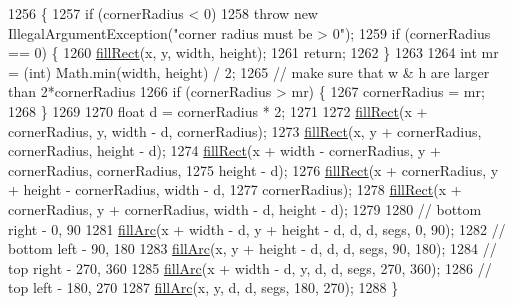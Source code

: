 \begin{DoxyCode}
1256                                         \{
1257         \textcolor{keywordflow}{if} (cornerRadius < 0)
1258             \textcolor{keywordflow}{throw} \textcolor{keyword}{new} IllegalArgumentException(\textcolor{stringliteral}{"corner radius must be > 0"});
1259         \textcolor{keywordflow}{if} (cornerRadius == 0) \{
1260             \mbox{\hyperlink{classorg_1_1newdawn_1_1slick_1_1_graphics_abf60283053540c66f00a722ebacb59a4}{fillRect}}(x, y, width, height);
1261             \textcolor{keywordflow}{return};
1262         \}
1263 
1264         \textcolor{keywordtype}{int} mr = (int) Math.min(width, height) / 2;
1265         \textcolor{comment}{// make sure that w & h are larger than 2*cornerRadius}
1266         \textcolor{keywordflow}{if} (cornerRadius > mr) \{
1267             cornerRadius = mr;
1268         \}
1269 
1270         \textcolor{keywordtype}{float} d = cornerRadius * 2;
1271 
1272         \mbox{\hyperlink{classorg_1_1newdawn_1_1slick_1_1_graphics_abf60283053540c66f00a722ebacb59a4}{fillRect}}(x + cornerRadius, y, width - d, cornerRadius);
1273         \mbox{\hyperlink{classorg_1_1newdawn_1_1slick_1_1_graphics_abf60283053540c66f00a722ebacb59a4}{fillRect}}(x, y + cornerRadius, cornerRadius, height - d);
1274         \mbox{\hyperlink{classorg_1_1newdawn_1_1slick_1_1_graphics_abf60283053540c66f00a722ebacb59a4}{fillRect}}(x + width - cornerRadius, y + cornerRadius, cornerRadius,
1275                 height - d);
1276         \mbox{\hyperlink{classorg_1_1newdawn_1_1slick_1_1_graphics_abf60283053540c66f00a722ebacb59a4}{fillRect}}(x + cornerRadius, y + height - cornerRadius, width - d,
1277                 cornerRadius);
1278         \mbox{\hyperlink{classorg_1_1newdawn_1_1slick_1_1_graphics_abf60283053540c66f00a722ebacb59a4}{fillRect}}(x + cornerRadius, y + cornerRadius, width - d, height - d);
1279 
1280         \textcolor{comment}{// bottom right - 0, 90}
1281         \mbox{\hyperlink{classorg_1_1newdawn_1_1slick_1_1_graphics_a6edeaec933b806a6a989023395d9b66e}{fillArc}}(x + width - d, y + height - d, d, d, segs, 0, 90);
1282         \textcolor{comment}{// bottom left - 90, 180}
1283         \mbox{\hyperlink{classorg_1_1newdawn_1_1slick_1_1_graphics_a6edeaec933b806a6a989023395d9b66e}{fillArc}}(x, y + height - d, d, d, segs, 90, 180);
1284         \textcolor{comment}{// top right - 270, 360}
1285         \mbox{\hyperlink{classorg_1_1newdawn_1_1slick_1_1_graphics_a6edeaec933b806a6a989023395d9b66e}{fillArc}}(x + width - d, y, d, d, segs, 270, 360);
1286         \textcolor{comment}{// top left - 180, 270}
1287         \mbox{\hyperlink{classorg_1_1newdawn_1_1slick_1_1_graphics_a6edeaec933b806a6a989023395d9b66e}{fillArc}}(x, y, d, d, segs, 180, 270);
1288     \}
\end{DoxyCode}
\mbox{\label{classorg_1_1newdawn_1_1slick_1_1_graphics_aef2136ee874864cef4886ad15485b79f}} 
